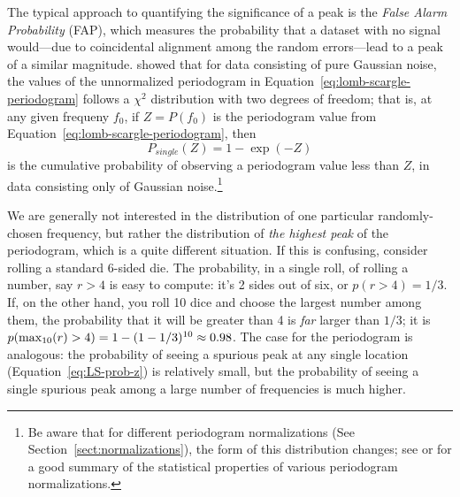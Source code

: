 \documentclass[preprint]{aastex}
\newcommand{\Eq}[1]{Equation~\ref{eq:#1}}
\newcommand{\eq}[1]{\Eq{#1}}
\newcommand{\eqlabel}[1]{\label{eq:#1}}
\newcommand{\Sect}[1]{Section~\ref{sect:#1}}
\newcommand{\sect}[1]{\Sect{#1}}
\begin{document}
The typical approach to quantifying the significance of a peak is the {\it
False Alarm Probability} (FAP), which measures the probability that a dataset
with no signal would---due to coincidental alignment among the random
errors---lead to a peak of a similar magnitude.
\citet{Scargle82} showed that for data consisting of pure Gaussian noise,
the values of the unnormalized
periodogram in \eq{lomb-scargle-periodogram} follows a $\chi^2$ distribution
with two degrees of freedom; that is, at any given frequeny $f_0$,
if $Z = P(f_0)$ is the periodogram value from \eq{lomb-scargle-periodogram},
then
\begin{equation}
  P_{single}(Z) = 1 - \exp(-Z)
  \eqlabel{LS-prob-z}
\end{equation}
is the cumulative probability of observing a periodogram value less than $Z$,
in data consisting only of Gaussian noise.\footnote{
  Be aware that for different periodogram normalizations
  (See \sect{normalizations}), the form of this distribution changes;
  see \citet{Cumming99} or
  \citet{Baluev2008} for a good summary of the statistical properties of
  various periodogram normalizations.
}


We are generally not interested in the distribution of one particular
randomly-chosen frequency,
but rather the distribution of {\it the highest peak} of the
periodogram, which is a quite different situation.
If this is confusing, consider rolling a standard 6-sided die.
The probability, in a single roll, of rolling a number, say $r > 4$ is easy
to compute: it's 2 sides out of six, or $p(r>4) = 1/3$.
If, on the other hand, you roll 10 dice and choose the largest number among
them, the probability that it will be greater than 4 is {\it far} larger
than $1/3$; it is $p({\rm max}_{10}(r) > 4) = 1 - (1 - 1/3)^{10} \approx 0.98$.
The case for the periodogram is analogous: the probability of seeing a
spurious peak at any single location (\eq{LS-prob-z}) is relatively small,
but the probability of seeing a single spurious peak among a large number
of frequencies is much higher.
\end{document}
